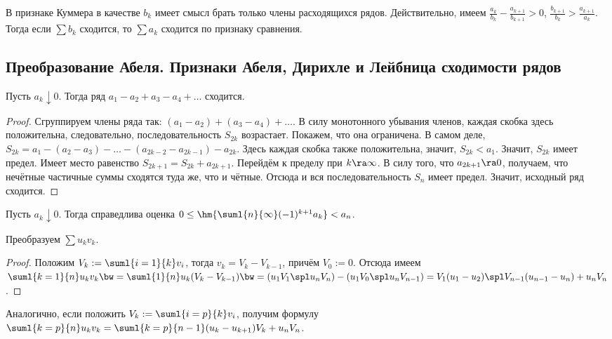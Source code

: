 \documentclass[a4paper]{article}
\begin{document}
\begin{note}
В признаке Куммера в качестве $b_k$ имеет смысл брать только члены расходящихся рядов. Действительно, имеем
$\frac{a_k}{b_k}-\frac{a_{k+1}}{b_{k+1}} > 0$,  $\frac{b_{k+1}}{b_k}>\frac{a_{k+1}}{a_k}$. Тогда если $\sum b_k$ сходится, то
$\sum a_k$ сходится по признаку сравнения.
\end{note}

\subsection{Преобразование Абеля. Признаки Абеля, Дирихле и Лейбница сходимости рядов}

\begin{theorem}
Пусть $a_k \downarrow 0$. Тогда ряд $a_1-a_2+a_3-a_4+\dots$ сходится.
\end{theorem}
\begin{proof}
Сгруппируем члены ряда так: $(a_1-a_2)+(a_3-a_4)+\dots$. В силу монотонного убывания членов, каждая скобка здесь положительна,
следовательно, последовательность $S_{2k}$ возрастает. Покажем, что она ограничена. В самом деле,
$S_{2k}=a_1-(a_2-a_3)-\dots-(a_{2k-2}-a_{2k-1})-a_{2k}$. Здесь каждая скобка также положительна, значит, $S_{2k} < a_1$.
Значит, $S_{2k}$ имеет предел. Имеет место равенство $S_{2k+1}=S_{2k} + a_{2k+1}$. Перейдём к пределу при $k \ra \infty$. В силу
того, что $a_{2k+1} \ra 0$, получаем, что нечётные частичные суммы сходятся
туда же, что и чётные. Отсюда и вся последовательность $S_n$ имеет предел. Значит, исходный ряд сходится.
\end{proof}

\begin{imp}
Пусть $a_k \downarrow 0$. Тогда справедлива оценка $0 \le \hm{\suml{n}{\infty} (-1)^{k+1}a_k} < a_n$.
\end{imp}

\begin{theorem}
Преобразуем $\sum u_kv_k$.
\end{theorem}
\begin{proof}
Положим $V_k := \suml{i=1}{k} v_i$, тогда $v_k= V_k-V_{k-1}$, причём $V_0:=0$.
Отсюда имеем $\suml{k=1}{n}u_k v_k\bw=\suml{1}{n}u_k(V_k-V_{k-1})\bw=(u_1V_1\spl u_nV_n)-(u_1V_0\spl u_nV_{n-1})=
V_1(u_1-u_2)\spl V_{n-1}(u_{n-1}-u_n) + u_nV_n$.
\end{proof}

\begin{note}
Аналогично, если положить $V_k:=\suml{i=p}{k}v_i$, получим формулу $\suml{k=p}{n}u_k v_k=\suml{k=p}{n-1}(u_k-u_{k+1})V_k + u_nV_n$.
\end{note}
\end{document}
